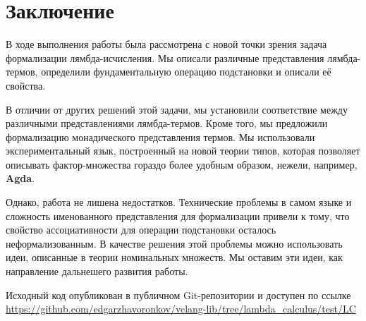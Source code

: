 \section*{Заключение}


В ходе выполнения работы была рассмотрена с новой точки зрения задача формализации лямбда-исчисления. Мы описали различные представления лямбда-термов, определили фундаментальную операцию подстановки и описали её свойства.

В отличии от других решений этой задачи, мы установили соответствие между различными представлениями лямбда-термов. Кроме того, мы предложили формализацию монадического представления термов. Мы использовали экспериментальный язык, построенный на новой теории типов, которая позволяет описывать фактор-множества гораздо более удобным образом, нежели, например, \textbf{Agda}.

Однако, работа не лишена недостатков. Технические проблемы в самом языке и сложность именованного представления для формализации привели к тому, что свойство ассоциативности для операции подстановки осталось неформализованным. В качестве решения этой проблемы можно использовать идеи, описанные в теории номинальных множеств. Мы оставим эти идеи, как направление дальнешего развития работы.

Исходный код опубликован в публичном Git-репозитории и доступен по ссылке \url{https://github.com/edgarzhavoronkov/vclang-lib/tree/lambda_calculus/test/LC}
